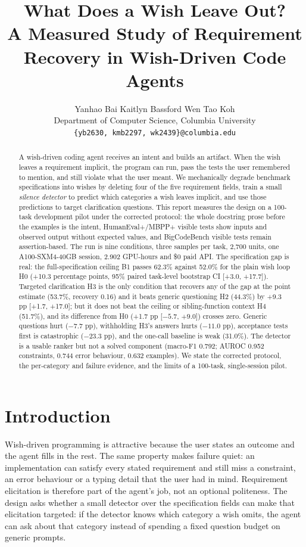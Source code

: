 \documentclass{article}
\title{What Does a Wish Leave Out?\\[0.4em]
{\large A Measured Study of Requirement Recovery in Wish-Driven Code Agents}}
\author{
  Yanhao Bai \quad Kaitlyn Bassford \quad Wen Tao Koh \\
  Department of Computer Science, Columbia University \\
  \texttt{\{yb2630, kmb2297, wk2439\}@columbia.edu}
}
\begin{document}
\maketitle

\begin{abstract}
A wish-driven coding agent receives an intent and builds an artifact. When the wish leaves a
requirement implicit, the program can run, pass the tests the user remembered to mention, and
still violate what the user meant. We mechanically degrade benchmark specifications into
wishes by deleting four of the five requirement fields, train a small \emph{silence detector} to predict
which categories a wish leaves implicit, and use those predictions to target clarification
questions. This report measures the design on a 100-task development pilot under the
corrected protocol: the whole docstring prose before the examples is the intent,
HumanEval+/MBPP+ visible tests show inputs and observed output without expected values, and
BigCodeBench visible tests remain assertion-based. The run is nine conditions, three samples
per task, 2{,}700 units, one A100-SXM4-40GB session, 2.902 GPU-hours and \$0 paid API. The
specification gap is real: the full-specification ceiling B1 passes 62.3\% against 52.0\% for
the plain wish loop H0 (+10.3 percentage points, 95\% paired task-level bootstrap CI
[+3.0, +17.7]). Targeted clarification H3 is the only condition that recovers any of the gap
at the point estimate (53.7\%, recovery 0.16) and it beats generic questioning H2 (44.3\%)
by +9.3 pp [+1.7, +17.0]; but it does not beat the ceiling or sibling-function context H4
(51.7\%), and its difference from H0 (+1.7 pp [$-5.7$, $+9.0$]) crosses zero. Generic
questions hurt ($-7.7$ pp), withholding H3's answers hurts ($-11.0$ pp), acceptance tests
first is catastrophic ($-23.3$ pp), and the one-call baseline is weak (31.0\%). The detector
is a usable ranker but not a solved component (macro-F1 0.792; AUROC 0.952 constraints,
0.744 error behaviour, 0.632 examples). We state the corrected protocol, the per-category and
failure evidence, and the limits of a 100-task, single-session pilot.
\end{abstract}

\section{Introduction}

Wish-driven programming is attractive because the user states an outcome and the agent fills in
the rest. The same property makes failure quiet: an implementation can satisfy every stated
requirement and still miss a constraint, an error behaviour or a typing detail that the user
had in mind. Requirement elicitation is therefore part of the agent's job, not an optional
politeness. The design asks whether a small detector over the specification fields can make
that elicitation targeted: if the detector knows which category a wish omits, the agent can
ask about that category instead of spending a fixed question budget on generic prompts.
\end{document}
